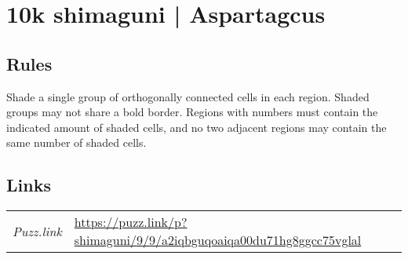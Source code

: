 \section[10k shimaguni | Aspartagcus {[\emph{Shimaguni}]}]{10k shimaguni | {\normalfont Aspartagcus}}
\label{sec:16-10k-shimaguni-aspartagcus}

\subsection*{Rules}
\begin{markdown}
Shade a single group of orthogonally connected cells in each region. Shaded groups may not share a bold border. Regions with numbers must contain the indicated amount of shaded cells, and no two adjacent regions may contain the same number of shaded cells.
\end{markdown}
\subsection*{Links}
\begin{tabularx}{\textwidth}{l X}
\emph{Puzz.link} & \url{https://puzz.link/p?shimaguni/9/9/a2iqbguqoaiqa00du71hg8ggcc75vglal} \\
\end{tabularx}
\pagebreak
